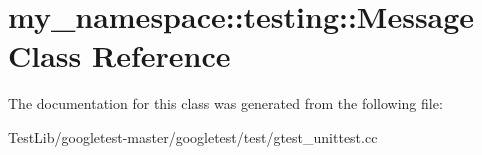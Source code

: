 \hypertarget{classmy__namespace_1_1testing_1_1Message}{}\section{my\+\_\+namespace\+:\+:testing\+:\+:Message Class Reference}
\label{classmy__namespace_1_1testing_1_1Message}


The documentation for this class was generated from the following file\+:\begin{DoxyCompactItemize}
\item 
Test\+Lib/googletest-\/master/googletest/test/gtest\+\_\+unittest.\+cc\end{DoxyCompactItemize}
